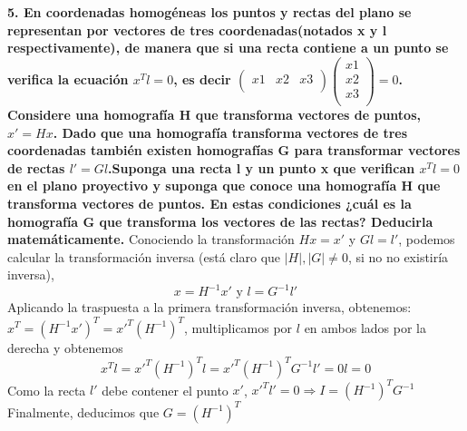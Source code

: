 \documentclass[12pt,a4paper]{article}
\begin{document}
	\newpage
	\textbf{5. En  coordenadas  homogéneas  los  puntos y  rectas  del  plano  se representan  por  vectores  de  tres  coordenadas(notados  x  y  l respectivamente), de manera que si una recta contiene a un punto se verifica la ecuación $x^Tl=0$, es decir 
	$\begin{pmatrix}
		x1 & x2 & x3\\
	\end{pmatrix}
	\begin{pmatrix}
		x1 \\ x2 \\ x3\\
	\end{pmatrix} = 0$. 
	Considere una homografía H que transforma vectores de puntos, $x'=Hx$. Dado que una homografía transforma vectores de tres coordenadas también existen homografías G para transformar vectores de rectas $l'=Gl$.Suponga una recta l y un punto x que verifican $x^Tl=0$ en el plano proyectivo y suponga  que  conoce  una  homografía  H  que transforma vectores  de puntos. En estas condiciones ¿cuál es la homografía G que transforma los vectores de las rectas? Deducirla matemáticamente.}
	\newline
	\newline
	Conociendo la transformación $Hx=x'$ y $Gl=l'$, podemos calcular la transformación inversa (está claro que $\vert H \vert, \vert G \vert \neq 0$, si no no existiría inversa),
	$$x=H^{-1}x' \text{ y } l=G^{-1}l'$$
	Aplicando la traspuesta a la primera transformación inversa, obtenemos: \newline $x^T=(H^{-1}x')^T=x'^T\left(H^{-1}\right)^T$, multiplicamos por $l$ en ambos lados por la derecha y obtenemos 
	$$ x^T l=x'^T\left(H^{-1}\right)^T l = x'^T\left(H^{-1}\right)^T G^{-1}l' = 0 l =0$$
	Como la recta $l'$ debe contener el punto $x'$, $x'^Tl'=0\Rightarrow I = \left(H^{-1}\right)^TG^{-1}$ \newline
	Finalmente, deducimos que $G = \left(H^{-1}\right)^T$
	
\end{document}
